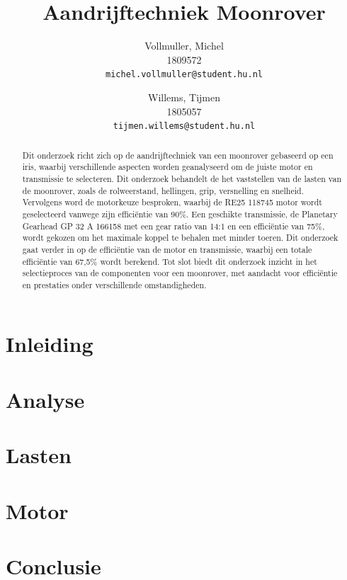\documentclass{article}
\title{Aandrijftechniek Moonrover}
\author{
  Vollmuller, Michel\\
  1809572\\
  \texttt{michel.vollmuller@student.hu.nl}
  \and
  Willems, Tijmen\\
  1805057\\
  \texttt{tijmen.willems@student.hu.nl}
}
\begin{document}
\maketitle

\begin{abstract}
  Dit onderzoek richt zich op de aandrijftechniek van een moonrover gebaseerd op een iris, waarbij verschillende aspecten worden geanalyseerd om de juiste motor en transmissie te selecteren. Dit onderzoek behandelt de het vaststellen van de lasten van de moonrover, zoals de rolweerstand, hellingen, grip, versnelling en snelheid. Vervolgens word de motorkeuze besproken, waarbij de RE25 118745 motor wordt geselecteerd vanwege zijn efficiëntie van 90\%. Een geschikte transmissie, de Planetary Gearhead GP 32 A 166158 met een gear ratio van 14:1 en een efficiëntie van 75\%, wordt gekozen om het maximale koppel te behalen met minder toeren. Dit onderzoek gaat verder in op de efficiëntie van de motor en transmissie, waarbij een totale efficiëntie van 67,5\% wordt berekend. Tot slot biedt dit onderzoek inzicht in het selectieproces van de componenten voor een moonrover, met aandacht voor efficiëntie en prestaties onder verschillende omstandigheden.
\end{abstract}

\tableofcontents

\newpage

\section{Inleiding}


\section{Analyse} 


\newpage

\section{Lasten}


\newpage

\section{Motor}


\newpage

\section*{Conclusie}

\end{document}
